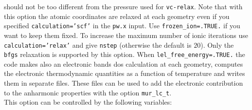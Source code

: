 \documentclass[12pt,a4paper,twoside]{report}
\begin{document}
should not be too different from the pressure used for \texttt{vc-relax}.
Note that with this option the atomic coordinates are relaxed at each
geometry even if you specified \texttt{calculation='scf'} in the 
\texttt{pw.x} input. Use \texttt{frozen\_ion=.TRUE.} if you want to keep
them fixed. To increase the maximum number of ionic iterations use
\texttt{calculation='relax'} and give \texttt{nstep} (otherwise the default 
is $20$). Only the \texttt{bfgs} relaxation is supported by this
option.
When \texttt{lel\_free\_energy=.TRUE.} the code makes also an electronic bands
dos calculation at each geometry, computes the electronic thermodynamic
quantities as a function of temperature and writes them in separate files.
These files can be used to add the electronic contribution to the
anharmonic properties with the option \texttt{mur\_lc\_t}.\\
This option can be controlled by the following variables:
\end{document}
